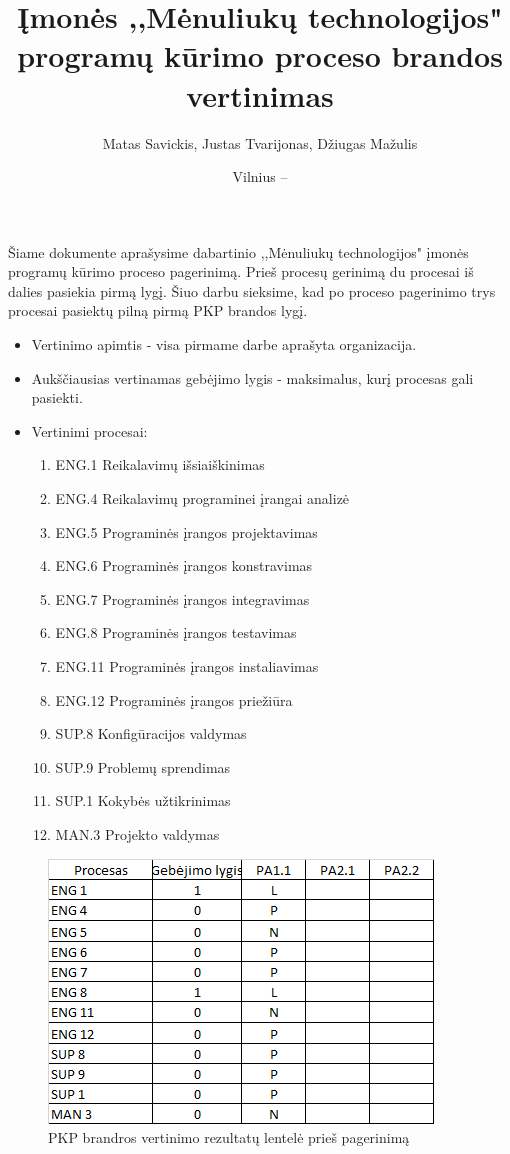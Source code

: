 \documentclass{VUMIFPSkursinis}
\title{Įmonės ,,Mėnuliukų technologijos" programų kūrimo proceso brandos vertinimas}
\author{Matas Savickis, Justas Tvarijonas, Džiugas Mažulis}
\date{Vilnius – \the\year}
\begin{document}
\maketitle

\tableofcontents

	Šiame dokumente aprašysime dabartinio ,,Mėnuliukų technologijos" įmonės programų kūrimo proceso pagerinimą. 
	Prieš procesų gerinimą du procesai iš dalies pasiekia pirmą lygį.
	Šiuo darbu sieksime, kad po proceso pagerinimo trys procesai pasiektų pilną pirmą PKP brandos lygį.

	\begin{itemize}
		\item Vertinimo apimtis - visa pirmame darbe aprašyta organizacija.
		\item Aukščiausias vertinamas gebėjimo lygis - maksimalus, kurį procesas gali pasiekti.
		\item Vertinimi procesai:
			\begin{enumerate}
				\item{ENG.1 Reikalavimų išsiaiškinimas}
				\item{ENG.4 Reikalavimų programinei įrangai analizė}
				\item{ENG.5 Programinės įrangos projektavimas}
				\item{ENG.6 Programinės įrangos konstravimas}
				\item{ENG.7 Programinės įrangos integravimas}
				\item{ENG.8 Programinės įrangos testavimas}
				\item{ENG.11 Programinės įrangos instaliavimas}
				\item{ENG.12 Programinės įrangos priežiūra}
				\item{SUP.8 Konfigūracijos valdymas}
				\item{SUP.9 Problemų sprendimas}
				\item{SUP.1 Kokybės užtikrinimas}
				\item{MAN.3 Projekto valdymas}
			\end{enumerate}
	\end{itemize}	

	\begin{figure}[!htbp]
		\includegraphics[scale=1]{img/lentelePries}
		\caption{PKP brandros vertinimo rezultatų lentelė prieš pagerinimą} %
		\label{img:LentelePries}
	\end{figure}
\end{document}
